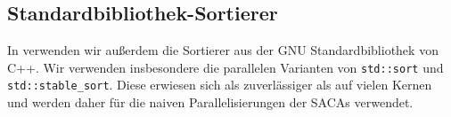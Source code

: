 \subsection{Standardbibliothek-Sortierer}
\label{section:stdsort}

In \sacabench verwenden wir außerdem die Sortierer aus der GNU Standardbibliothek von C++.
Wir verwenden insbesondere die parallelen Varianten von \texttt{std::sort}
und \texttt{std::stable\_sort}.
Diese erwiesen sich als zuverlässiger als \ipsviero auf vielen Kernen
und werden daher für die naiven Parallelisierungen der SACAs verwendet.